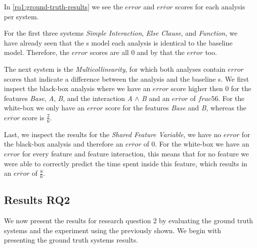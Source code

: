 In \autoref{rq1:ground-truth-results} we see the $error$ and $\overline{error}$ scores for each analysis per system. 

For the first three systems \emph{Simple Interaction}, \emph{Else Clause}, and \emph{Function},
we have already seen that the {\perfInfluenceModel}s model each analysis is identical to the baseline model. 
Therefore, the $error$ scores are all $0$ and by that the $\overline{error}$ too.

The next system is the \emph{Multicollinearity}, for which both analyses contain $error$ scores that indicate a difference 
between the analysis and the baseline {\perfInfluenceModel}s. We first inspect the black-box analysis {\perfInfluenceModel} 
where we have an $error$ score higher then $0$ for the features \emph{Base}, \emph{A}, \emph{B}, 
and the interaction \emph{A} $\land$ \emph{B} and an $\overline{error}$ of $frac{5}{6}$. 
For the white-box we only have an $error$ score for the features \emph{Base} and \emph{B}, whereas the $\overline{error}$ score is $\frac{2}{6}$.

Last, we inspect the results for the \emph{Shared Feature Variable}, we have no $error$ for the black-box analysis and therefore an $\overline{error}$
of $0$. For the white-box we have an $error$ for every feature and feature interaction, this means that for no feature we were able to
correctly predict the time spent inside this feature, which results in an $\overline{error}$ of  $\frac{8}{6}$.

\subsection{Results RQ2}

We now present the results for research question 2 by evaluating the ground truth systems and the experiment using the {\perfInfluenceModel} 
previously shown. We begin with presenting the ground truth systems results.

